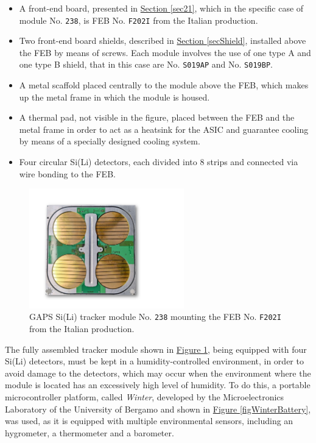 \begin{itemize}
    \itemsep0em
    \item A front-end board, presented in \hyperref[sec21]{Section \ref{sec21}}, which in the specific case of module No. \texttt{238}, is FEB No. \texttt{F202I} from the Italian production.
    \item Two front-end board shields, described in \hyperref[secShield]{Section \ref{secShield}}, installed above the FEB by means of screws. Each module involves the use of one type A and one type B shield, that in this case are No. \texttt{S019AP} and No. \texttt{S019BP}.
    \item A metal scaffold placed centrally to the module above the FEB, which makes up the metal frame in which the module is housed.
    \item A thermal pad, not visible in the figure, placed between the FEB and the metal frame in order to act as a heatsink for the ASIC and guarantee cooling by means of a specially designed cooling system.
    \item Four circular Si(Li) detectors, each divided into 8 strips and connected via wire bonding to the FEB.
\end{itemize}

\begin{figure}[h!]
    \centering
    \includegraphics[width=0.6\textwidth]{Images/chap3/GAPS_module.pdf}
    \caption{GAPS Si(Li) tracker module No. \texttt{238} mounting the FEB No. \texttt{F202I} from the Italian production.}
    \label{figSILImodule}
\end{figure}

\par
The fully assembled tracker module shown in \hyperref[figSILImodule]{Figure \ref{figSILImodule}}, being equipped with four Si(Li) detectors, must be kept in a humidity-controlled environment, in order to avoid damage to the detectors, which may occur when the environment where the module is located has an excessively high level of humidity. To do this, a portable microcontroller platform, called \textit{Winter}, developed by the Microelectronics Laboratory of the University of Bergamo and shown in \hyperref[figWinterBattery]{Figure \ref{figWinterBattery}}, was used, as it is equipped with multiple environmental sensors, including an hygrometer, a thermometer and a barometer. 

